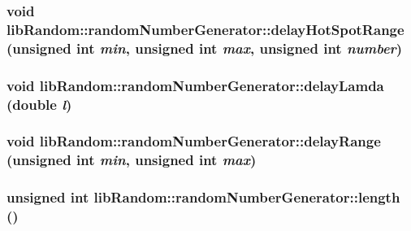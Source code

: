 \begin{CompactItemize}
\hypertarget{classlibRandom_1_1randomNumberGenerator_c1a9329975b50675d340ffd4d788a794}{
\subsubsection[{delayHotSpotRange}]{\setlength{\rightskip}{0pt plus 5cm}void libRandom::randomNumberGenerator::delayHotSpotRange (unsigned int {\em min}, \/  unsigned int {\em max}, \/  unsigned int {\em number})}}
\label{classlibRandom_1_1randomNumberGenerator_c1a9329975b50675d340ffd4d788a794}


\hypertarget{classlibRandom_1_1randomNumberGenerator_0827267ed2292a67fa14d77be35b58bc}{
\subsubsection[{delayLamda}]{\setlength{\rightskip}{0pt plus 5cm}void libRandom::randomNumberGenerator::delayLamda (double {\em l})}}
\label{classlibRandom_1_1randomNumberGenerator_0827267ed2292a67fa14d77be35b58bc}


\hypertarget{classlibRandom_1_1randomNumberGenerator_9294756c2fadecd72dae9ac8bef46ed8}{
\subsubsection[{delayRange}]{\setlength{\rightskip}{0pt plus 5cm}void libRandom::randomNumberGenerator::delayRange (unsigned int {\em min}, \/  unsigned int {\em max})}}
\label{classlibRandom_1_1randomNumberGenerator_9294756c2fadecd72dae9ac8bef46ed8}


\hypertarget{classlibRandom_1_1randomNumberGenerator_5b360c7a906759126af0c3448c55665c}{
\subsubsection[{length}]{\setlength{\rightskip}{0pt plus 5cm}unsigned int libRandom::randomNumberGenerator::length ()}}
\label{classlibRandom_1_1randomNumberGenerator_5b360c7a906759126af0c3448c55665c}



\end{CompactItemize}
